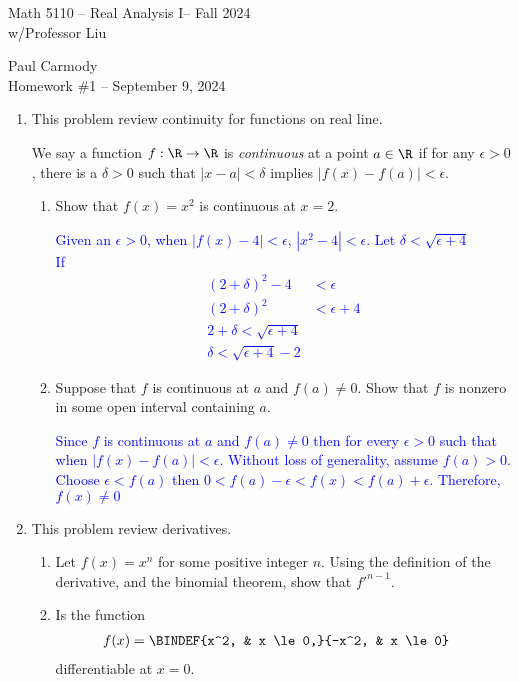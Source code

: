 \documentclass[10pt,a4paper]{report}
\newcommand{\CLASSNAME}{Math 5110 -- Real Analysis I}
\newcommand{\STUDENTNAME}{Paul Carmody}
\newcommand{\ASSIGNMENT}{Homework \#1 }
\newcommand{\DUEDATE}{September 9, 2024}
\newcommand{\SEMESTER}{Fall 2024}
\newcommand{\BLUE}[1]{\textcolor{blue}{#1}}
\begin{document}
\begin{center}
	\Large{\CLASSNAME -- \SEMESTER} \\
	\large{ w/Professor Liu}
\end{center}
\begin{center}
	\STUDENTNAME \\
	\ASSIGNMENT -- \DUEDATE\\
\end{center} 

\begin{enumerate}[label=\Roman*.]
\item This problem review continuity for functions on real line.

We say a function $f: \R \to \R$ is \textit{continuous} at a point $a \in \R$ if for any $\epsilon > 0$, there is a $\delta > 0$ such that $|x-a| < \delta$ implies $|f(x)-f(a)|< \epsilon$.
\begin{enumerate}[label=(\alph*)]
\item Show that $f(x)=x^2$ is continuous at $x=2$.

\BLUE{Given an $\epsilon > 0$, when $|f(x)-4|< \epsilon$, $ |x^2 -4| < \epsilon$.  Let $\delta < \sqrt{\epsilon + 4}$ \\
If \begin{align*}
	(2+\delta)^2-4 &< \epsilon \\
	(2+\delta)^2&< \epsilon +4\\
	2+\delta < \sqrt{\epsilon +4} \\
	\delta < \sqrt{\epsilon+4}-2
\end{align*} }

\item Suppose that $f$ is continuous at $a$ and $f(a) \ne 0$. Show that $f$ is nonzero in some open interval containing $a$.

\BLUE{Since $f$ is continuous at $a$ and $f(a) \ne 0$ then for every $\epsilon > 0$ such that when $|f(x)-f(a)| < \epsilon$.  Without loss of generality, assume $f(a) > 0$.  Choose $\epsilon < f(a)$ then $0 < f(a)-\epsilon < f(x) < f(a) + \epsilon$.  Therefore, $f(x) \ne 0$ }

\end{enumerate}

\item This problem review derivatives.
\begin{enumerate}[label=(\alph*)]
\item Let $f(x)=x^n$ for some positive integer $n$.  Using the definition of the derivative, and the binomial theorem, show that $f'^{n-1}$.
\item Is the function 
\begin{align*}
	f(x) &= \BINDEF{x^2, & x \le 0,}{-x^2, & x \le 0}
\end{align*}differentiable at $x=0$.


\end{enumerate}
\end{enumerate}
\end{document}
